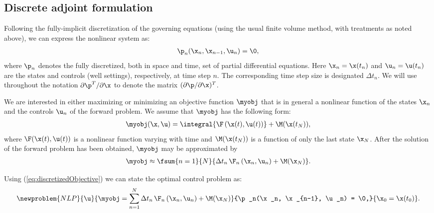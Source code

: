 \subsection{Discrete adjoint formulation} \label{section:discreteAdjoint}

Following the fully-implicit discretization of the governing equations (using the usual finite volume method, with treatments as noted above), we can express the nonlinear system as:
%
\begin{align}
\label{eq:DiscretizedEquations}
\p_n(\x_n, \x_{n-1}, \u_n) =  \0 \rm,
\end{align}
%
where $\p_n$ denotes the fully discretized, both in space and time,
set of partial differential equations. Here $\x_n = \x(t_n)$ and $\u_n =
\u(t_n)$ are the states and controls (well settings), respectively, at time step $n$. The corresponding time step size
is designated $\Delta t_n$. We will use throughout the notation $\partial \p^T / \partial \x$ to denote the matrix $(\partial \p / \partial \x)^T$.



We are interested in either maximizing or minimizing
an objective function $\myobj$ that is in general a nonlinear function of the
states $\x_n$ and the controls $\u_n$ of the forward problem. We
assume that $\myobj$ has the following form:
%
\begin{align}
  \label{eq:continuousObjective}
  \myobj(\x, \u) = \integral{\F\left ( \x(t), \u(t) \right )} + \M(\x(t_N)),
\end{align}
%
where $\F(\x(t), \u(t))$ is a nonlinear function varying with time and $\M(\x(t_N))$ is a
function of only the last state $\x_N$. After the solution of the
forward problem has been obtained, $\myobj$ may be approximated by
%
\begin{align}
  \label{eq:discretizedObjective}
  \myobj \approx \fsum{n=1}{N}{ \Delta t_n \, \F_n \left ( \x_n, \u_n \right ) + \M(\x_N) }.
\end{align}
%

Using (\ref{eq:discretizedObjective}) we can state the optimal control
problem as:
\[
   \newproblem{NLP}{\u}{\displaystyle \myobj =
  \sum_{n=1}^N \Delta t_n \, \F_n \left ( \x_n, \u_n \right ) + \M(\x_N) }
                 {\p_n(\x_n, \x_{n-1}, \u_n) = \0,}
                 {\x_0 = \x(t_0)}.
\]

